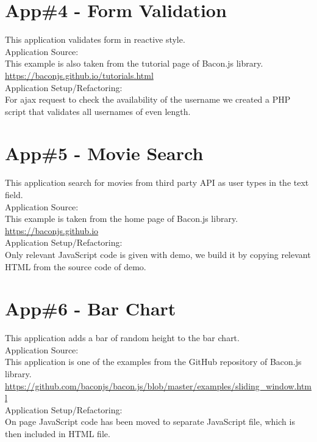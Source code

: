 \section{App\#4 - Form Validation}
This application validates form in reactive style.\\
Application Source: \\
This example is also taken from the tutorial page of Bacon.js library.\\
\url{https://baconjs.github.io/tutorials.html}\\
Application Setup/Refactoring: \\
For ajax request to check the availability of the username we created a PHP script that validates all usernames of even length.


\section{App\#5 - Movie Search}
This application search for movies from third party API as user types in the text field.\\
Application Source: \\
This example is taken from the home page of Bacon.js library.\\
\url{https://baconjs.github.io}\\
Application Setup/Refactoring: \\
Only relevant JavaScript code is given with demo, we build it by copying relevant HTML from the source code of demo. 


\section{App\#6 - Bar Chart}
This application adds a bar of random height to the bar chart.\\
Application Source: \\
This application is one of the examples from the GitHub repository of Bacon.js library.\\
\url{https://github.com/baconjs/bacon.js/blob/master/examples/sliding_window.html}\\
Application Setup/Refactoring: \\
On page JavaScript code has been moved to separate JavaScript file, which is then included in HTML file.


